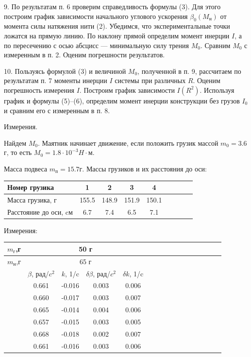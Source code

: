 \documentclass[14pt]{article}
\begin{document}
9. По результатам п. 6 проверим справедливость формулы (3). Для этого построим график зависимости начального углового ускорения $\beta_0(M_\text{н})$ от момента силы натяжения нити (2). Убедимся, что экспериментальные точки ложатся на прямую линию. По наклону прямой определим момент инерции $I$, а по пересечению с осью абсцисс --- минимальную силу трения $M_0$. Сравним $M_0$ с измеренным в п. 2. Оценим погрешности результатов.

10. Пользуясь формулой (3) и величиной $M_0$, полученной в п. 9, рассчитаем по результатам п. 7 моменты инерции $I$ системы при различных $R$. Оценим погрешность измерения $I$. Построим график зависимости $I(R^2)$. Используя график и формулы (5)–(6), определим момент инерции конструкции без грузов $I_0$ и сравним его с измеренным в п. 8.

\vspace{1cm}
Измерения.

\vspace{1cm}
Найдем $M_0$. Маятник начинает движение, если положить грузик массой $m_0 = 3.6$г, то есть $M_0 = 1.8 \cdot 10^{-3} H\cdot\text{м}$.

\vspace{1cm}

Масса подвеса $m_\text{п} = 15.7$г. 
Массы грузиков и их расстояния до оси:
\begin{center}
\begin{tabular}{|l|c|c|c|c|c|c|c|c|}
\hline
Номер грузика			&	1		&	2		&	3		&	4		\\
\hline
Масса грузика, г		&	155.5	&	148.9	&	151.9	&	150.1	\\
\hline
Расстояние до оси, cм	&	6.7		&	7.4		&	6.5		&	7.1		\\
\hline
\end{tabular}
\end{center}

Измерения:
\begin{center}
\begin{tabular}{|c|c|c|c|c|c|c|c|c|c|c|c|c|c|c|c|}
\hline
$m_\text{г}$,г	&\multicolumn{4}{|c|}{50 г}			\\
\hline
$m_\text{н}$,г	&\multicolumn{4}{|c|}{65 г}		\\
\hline
				&	$\beta$, рад/$c^2$		&	$k$, 1/c		&	$\delta\beta$, рад/$c^2$		&	$\delta k$, 1/c			\\
\hline
				&	0.661					&	-0.016			&	0.003							&	0.006					\\
\hline
				&	0.660					&	-0.017			&	0.003							&	0.007					\\
\hline
				&	0.665					&	-0.014			&	0.004							&	0.006					\\
\hline
				&	0.657					&	-0.015			&	0.003							&	0.005					\\
\hline
				&	0.668					&	-0.018			&	0.002							&	0.007					\\
\hline
				&	0.661					&	-0.016			&	0.003							&	0.006					\\
\hline
\end{tabular}
\end{center}
\end{document}
